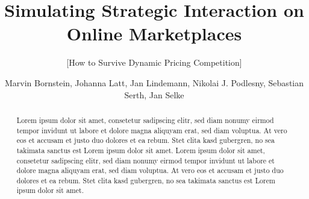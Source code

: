 \documentclass{sig-alternate-05-2015}
\begin{document}



%


\title{Simulating Strategic Interaction on Online Marketplaces}
\subtitle{[How to Survive Dynamic Pricing Competition]}



%
\author{Marvin Bornstein, Johanna Latt, Jan Lindemann, Nikolai J. Podlesny, Sebastian Serth, Jan Selke}

    

\maketitle

%
%
%
%

\begin{abstract}
Lorem ipsum dolor sit amet, consetetur sadipscing elitr, sed diam nonumy eirmod tempor invidunt ut labore et dolore magna aliquyam erat, sed diam voluptua. At vero eos et accusam et justo duo dolores et ea rebum. Stet clita kasd gubergren, no sea takimata sanctus est Lorem ipsum dolor sit amet. Lorem ipsum dolor sit amet, consetetur sadipscing elitr, sed diam nonumy eirmod tempor invidunt ut labore et dolore magna aliquyam erat, sed diam voluptua. At vero eos et accusam et justo duo dolores et ea rebum. Stet clita kasd gubergren, no sea takimata sanctus est Lorem ipsum dolor sit amet.\\
\end{abstract}









\end{document}
